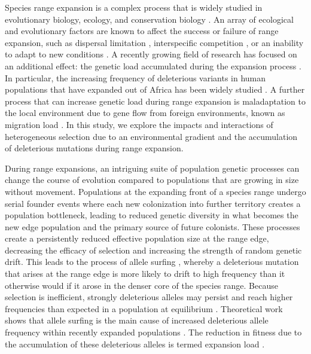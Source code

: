 Species range expansion is a complex process that is widely studied in evolutionary biology, ecology, and conservation biology \citep{Hastings:2005, Phillips:2006, Excoffier:2009, Hallatschek:2010, Chen:2011, Colautti:2013}. An array of ecological and evolutionary factors are known to affect the success or failure of range expansion, such as dispersal limitation \citep{Hastings:2005, Marsico:2009, Hargreaves:2014b}, interspecific competition \citep{Case:2000, Price:2009, Svenning:2014, Louthan:2015}, or an inability to adapt to new conditions \citep{Angert:2008, Holt:2011, Polechova:2015}. A recently growing field of research has focused on an additional effect: the genetic load accumulated during the expansion process \citep{Excoffier:2009, Hallatschek:2010, Peischl:2013, Peischl:2015, Peischl:2015b}. In particular, the increasing frequency of deleterious variants in human populations that have expanded out of Africa has been widely studied \citep{Lohmueller:2008, Do:2015, Henn:2015}. A further process that can increase genetic load during range expansion is maladaptation to the local environment due to gene flow from foreign environments, known as migration load \citep{Kirkpatrick:1997, Barton:2001, Polechova:2015}. In this study, we explore the impacts and interactions of heterogeneous selection due to an environmental gradient and the accumulation of deleterious mutations during range expansion.

During range expansions, an intriguing suite of population genetic processes can change the course of evolution compared to populations that are growing in size without movement. Populations at the expanding front of a species range undergo serial founder events where each new colonization into further territory creates a population bottleneck, leading to reduced genetic diversity in what becomes the new edge population and the primary source of future colonists. These processes create a persistently reduced effective population size at the range edge, decreasing the efficacy of selection and increasing the strength of random genetic drift. This leads to the process of allele surfing \citep{Klopfstein:2006}, whereby a deleterious mutation that arises at the range edge is more likely to drift to high frequency than it otherwise would if it arose in the denser core of the species range. Because selection is inefficient, strongly deleterious alleles may persist and reach higher frequencies than expected in a population at equilibrium \citep{Peischl:2015}. Theoretical work shows that allele surfing is the main cause of increased deleterious allele frequency within recently expanded populations \citep{Excoffier:2009}. The reduction in fitness due to the accumulation of these deleterious alleles is termed expansion load \citep{Peischl:2013,Peischl:2015}.

